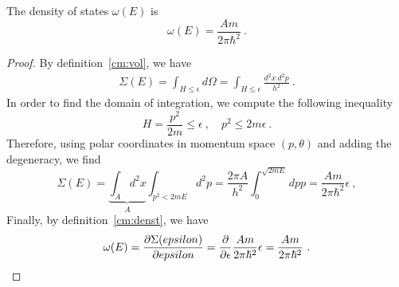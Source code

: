     The density of states $\omega(E)$ is 
    \begin{equation*}
        \omega(E) = \frac{A m}{2 \pi \hbar^2} ~.
    \end{equation*}
    \begin{proof}
        By definition~\eqref{cm:vol}, we have
        \begin{equation*}
        \begin{aligned}
            \Sigma (E) = \int_{H \leq \epsilon} d\Omega = \int_{H \leq \epsilon} \frac{d^2 x ~ d^2 p}{h^2} ~.
        \end{aligned}
        \end{equation*}
        In order to find the domain of integration, we compute the following inequality
        \begin{equation*}
            H = \frac{p^2}{2m} \leq \epsilon ~, \quad p^2 \leq 2 m \epsilon ~.
        \end{equation*}
        Therefore, using polar coordinates in momentum space $(p, \theta)$ and adding the degeneracy, we find
        \begin{equation*}
            \Sigma (E) = \underbrace{\int_A d^2 x}_A \int_{p^2 < 2mE} d^2 p = \frac{2 \pi A}{h^2} \int_0^{\sqrt{2mE}} dp p = \frac{A m}{2 \pi \hbar^2} \epsilon ~,
        \end{equation*}
        Finally, by definition~\eqref{cm:denst}, we have
        \begin{equation*}
            \omega (E) = \frac{\partial\Sigma (epsilon)}{\partial epsilon} = \frac{\partial}{\partial\epsilon} \frac{A m}{2 \pi \hbar^2} \epsilon = \frac{A m}{2 \pi \hbar^2} ~.
        \end{equation*}
    \end{proof}

